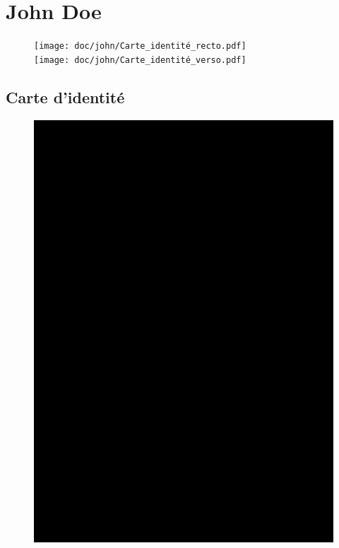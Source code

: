 \chapter{John Doe}
\hypertarget{chapter::\theHchapter}{}

\thispagestyle{empty}
\minitoc
\vspace{1cm}

\begin{figure}[H]
\centering
\texttt{[image: doc/john/Carte\_identité\_recto.pdf]}\\
\vspace{1cm}
\texttt{[image: doc/john/Carte\_identité\_verso.pdf]}
\end{figure}
\section{Carte d'identité}

\newpage
\begin{figure}[H]
\centering
\includegraphics[page=1, width=0.9\linewidth]{doc/john/Document_1.pdf}
\end{figure}
